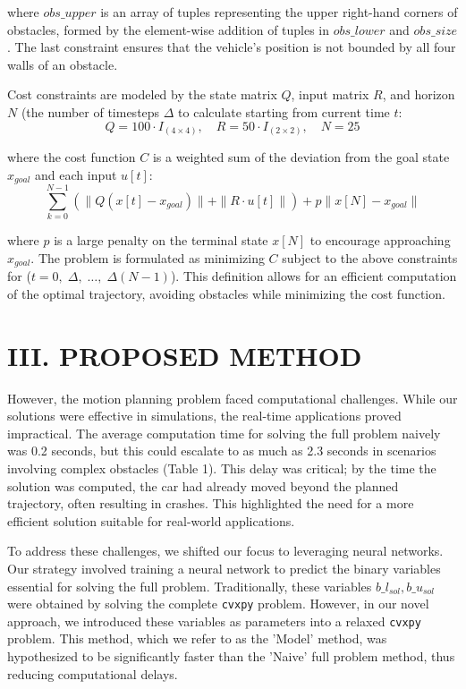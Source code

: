 \documentclass[
	letterpaper, %
	10pt, %
	unnumberedsections, %
	twoside, %
]{LTJournalArticle}
\begin{document}
\noindent where \(obs\_upper\) is an array of tuples representing the upper right-hand corners of obstacles, formed by the element-wise addition of tuples in \(obs\_lower\) and \(obs\_size\). The last constraint ensures that the vehicle's position is not bounded by all four walls of an obstacle.

Cost constraints are modeled by the state matrix \(Q\), input matrix \(R\), and horizon \(N\) (the number of timesteps \(\Delta\) to calculate starting from current time \(t\):
\[Q = 100 \cdot I_{(4\times4)}, \quad R = 50 \cdot I_{(2\times2)}, \quad N = 25\]

\noindent where the cost function \(C\) is a weighted sum of the deviation from the goal state \(x_{goal}\) and each input \(u[t]\):
\[\sum_{k=0}^{N-1} \left( \| Q (x[t] - x_{goal}) \| + \| R \cdot u[t] \| \right) + p \| x[N] - x_{goal} \|\]

\noindent where \(p\) is a large penalty on the terminal state \(x[N]\) to encourage approaching \(x_{goal}\).
The problem is formulated as minimizing \(C\) subject to the above constraints for (\(t = 0,\; \Delta,\; \ldots,\; \Delta(N-1)\)). This definition allows for an efficient computation of the optimal trajectory, avoiding obstacles while minimizing the cost function.

\section{III. PROPOSED METHOD}

\quad However, the motion planning problem faced computational challenges. While our solutions were effective in simulations, the real-time applications proved impractical. The average computation time for solving the full problem naively was 0.2 seconds, but this could escalate to as much as 2.3 seconds in scenarios involving complex obstacles (Table 1). This delay was critical; by the time the solution was computed, the car had already moved beyond the planned trajectory, often resulting in crashes. This highlighted the need for a more efficient solution suitable for real-world applications.

To address these challenges, we shifted our focus to leveraging neural networks. Our strategy involved training a neural network to predict the binary variables essential for solving the full problem. Traditionally, these variables \(b\_l_{sol}, b\_u_{sol}\) were obtained by solving the complete \texttt{cvxpy} problem. However, in our novel approach, we introduced these variables as parameters into a relaxed \texttt{cvxpy} problem. This method, which we refer to as the 'Model' method, was hypothesized to be significantly faster than the 'Naive' full problem method, thus reducing computational delays.
\end{document}
